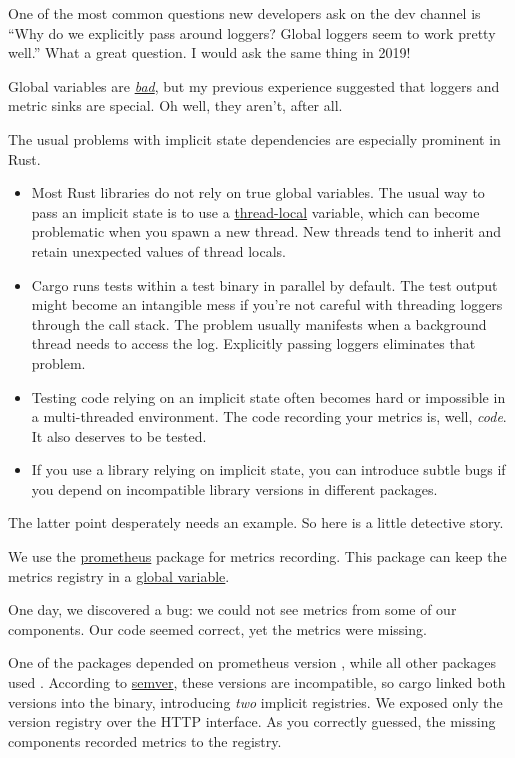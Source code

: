 \documentclass{article}
\begin{document}
One of the most common questions new developers ask on the dev channel is ``Why do we explicitly pass around loggers? Global loggers seem to work pretty well.''
What a great question.
I would ask the same thing in 2019!

Global variables are \href{http://wiki.c2.com/?GlobalVariablesAreBad}{\emph{bad}}, but my previous experience suggested that loggers and metric sinks are special.
Oh well, they aren't, after all.

The usual problems with implicit state dependencies are especially prominent in Rust.
\begin{itemize}
\item 
  Most Rust libraries do not rely on true global variables.
  The usual way to pass an implicit state is to use a \href{https://doc.rust-lang.org/stable/std/macro.thread_local.html}{thread-local} variable, which can become problematic when you spawn a new thread.
  New threads tend to inherit and retain unexpected values of thread locals.
\item 
  Cargo runs tests within a test binary in parallel by default.
  The test output might become an intangible mess if you’re not careful with threading loggers through the call stack.
  The problem usually manifests when a background thread needs to access the log.
  Explicitly passing loggers eliminates that problem.
\item 
  Testing code relying on an implicit state often becomes hard or impossible in a multi-threaded environment.
  The code recording your metrics is, well, \emph{code}.
  It also deserves to be tested.
\item 
  If you use a library relying on implicit state, you can introduce subtle bugs if you depend on incompatible library versions in different packages.
\end{itemize}

The latter point desperately needs an example.
So here is a little detective story.

We use the \href{https://crates.io/crates/prometheus}{prometheus} package for metrics recording.
This package can keep the metrics registry in a \href{https://docs.rs/prometheus/0.10.0/src/prometheus/registry.rs.html#307-317}{global variable}.

One day, we discovered a bug: we could not see metrics from some of our components.
Our code seemed correct, yet the metrics were missing.

One of the packages depended on prometheus version , while all other packages used .
According to \href{https://semver.org/}{semver}, these versions are incompatible, so cargo linked both versions into the binary, introducing \emph{two} implicit registries.
We exposed only the  version registry over the HTTP interface.
As you correctly guessed, the missing components recorded metrics to the  registry.
\end{document}
